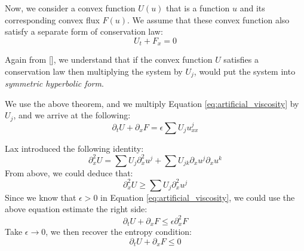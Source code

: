 \documentclass[a4paper]{article}
\numberwithin{equation}{section}
\begin{document}
Now, we consider a convex function $U(u)$ that is a function $u$ and its corresponding convex flux $F(u)$. We assume that these convex function also satisfy a separate form of conservation law:
\begin{equation}
    U_t + F_x = 0
\end{equation}

Again from [], we understand that if the convex function $U$ satisfies a conservation law then multiplying the system by $U_j$, would put the system into \textit{symmetric hyperbolic form}.

We use the above theorem, and we multiply Equation \ref{eq:artificial_viscosity} by $U_j$, and we arrive at the following:
\begin{equation}
    \partial_t U + \partial_x F = \epsilon \sum U_j u^j_{xx}
\end{equation}

Lax introduced the following identity:
\begin{equation}
    \partial_x^2 U = \sum U_j \partial_x^2 u^j + \sum U_{jk} \partial_x u^j \partial_x u^k
\end{equation}
From above, we could deduce that:
\begin{equation}
    \partial_x^2 U \geq \sum U_j \partial_x^2 u^j
\end{equation}
Since we know that $\epsilon > 0$ in Equation \ref{eq:artificial_viscosity}, we could use the above equation estimate the right side:
\begin{equation}
    \partial_t U + \partial_x F \leq \epsilon \partial_x^2 F
\end{equation}
Take $\epsilon \rightarrow 0$, we then recover the entropy condition:
\begin{equation}
    \partial_t U + \partial_x F \leq 0
\end{equation}
\end{document}
